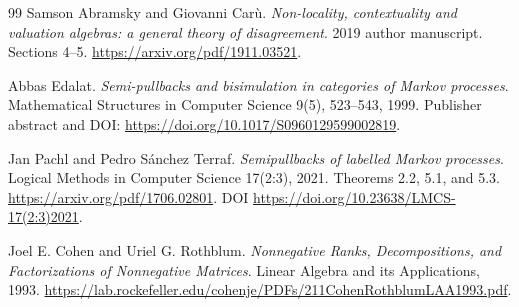 \documentclass[11pt]{article}
\theoremstyle{remark}
\begin{document}
\begin{thebibliography}{99}
Samson Abramsky and Giovanni Car\`u.
\emph{Non-locality, contextuality and valuation algebras: a general theory of disagreement}.
2019 author manuscript. Sections 4--5.
\url{https://arxiv.org/pdf/1911.03521}.

Abbas Edalat.
\emph{Semi-pullbacks and bisimulation in categories of Markov processes}.
Mathematical Structures in Computer Science 9(5), 523--543, 1999.
Publisher abstract and DOI:
\url{https://doi.org/10.1017/S0960129599002819}.

Jan Pachl and Pedro S\'anchez Terraf.
\emph{Semipullbacks of labelled Markov processes}.
Logical Methods in Computer Science 17(2:3), 2021.
Theorems 2.2, 5.1, and 5.3.
\url{https://arxiv.org/pdf/1706.02801}.
DOI \url{https://doi.org/10.23638/LMCS-17(2:3)2021}.

Joel E. Cohen and Uriel G. Rothblum.
\emph{Nonnegative Ranks, Decompositions, and Factorizations of Nonnegative Matrices}.
Linear Algebra and its Applications, 1993.
\url{https://lab.rockefeller.edu/cohenje/PDFs/211CohenRothblumLAA1993.pdf}.
\end{thebibliography}
\end{document}

